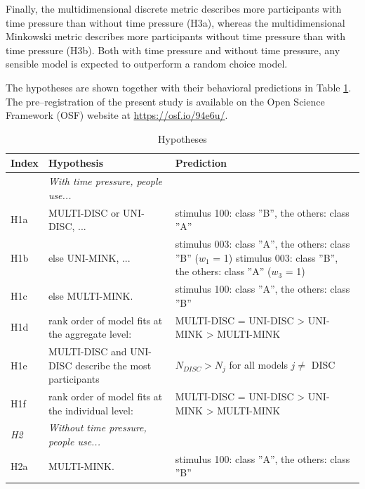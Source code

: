 \documentclass[a4paper,man,natbib]{apa6}
\begin{document}
Finally, the multidimensional discrete metric describes more participants with time pressure than without time pressure (H3a), whereas the multidimensional Minkowski metric describes more participants without time pressure than with time pressure (H3b). Both with time pressure and without time pressure, any sensible model is expected to outperform a random choice model. 

The hypotheses are shown together with their behavioral predictions in Table \ref{tab:hypotheses}. The pre--registration of the present study is available on the Open Science Framework (OSF) website at \href{https://osf.io/94e6u/}{https://osf.io/94e6u/}.

\begin{table}
\begin{center}
\begin{threeparttable}
\caption{Hypotheses}
\label{tab:hypotheses}
\begin{tabular*}{\textwidth}{lp{115mm}p{110mm}}
\toprule
\multicolumn{1}{l}{Index} & \multicolumn{1}{l}{Hypothesis} & \multicolumn{1}{l}{Prediction}\\
\midrule
\addlinespace
\multicolumn{1}{l}{\emph{H1}} & \multicolumn{1}{l}{\emph{With time pressure, people use...}} \\
\addlinespace
H1a & MULTI-DISC or UNI-DISC, ... & stimulus 100: class ''B'', the others: class ''A''\\
\addlinespace
H1b & else UNI-MINK, ...  & stimulus 003: class ''A'', the others: class ''B'' ($w_1$ = 1) \newline stimulus 003: class ''B'', the others: class ''A'' ($w_3$ = 1)\\
\addlinespace
H1c & else MULTI-MINK. & stimulus 100: class ''A'', the others: class ''B''\\
\addlinespace
H1d & rank order of model fits at the aggregate level: & MULTI-DISC = UNI-DISC > UNI-MINK > MULTI-MINK\\
\addlinespace
H1e & MULTI-DISC and UNI-DISC describe the most participants & $N_{DISC} > N_{j}$ for all models $j \neq$ DISC\\
\addlinespace
H1f & rank order of model fits at the individual level: & MULTI-DISC = UNI-DISC > UNI-MINK > MULTI-MINK\\
\midrule
\multicolumn{1}{l}{\emph{H2}} & \multicolumn{1}{l}{\emph{Without time pressure, people use...}} \\
\addlinespace
H2a & MULTI-MINK. & stimulus 100: class ''A'', the others: class ''B''\\

\end{tabular*}
\end{threeparttable}
\end{center}
\end{table}
\end{document}
